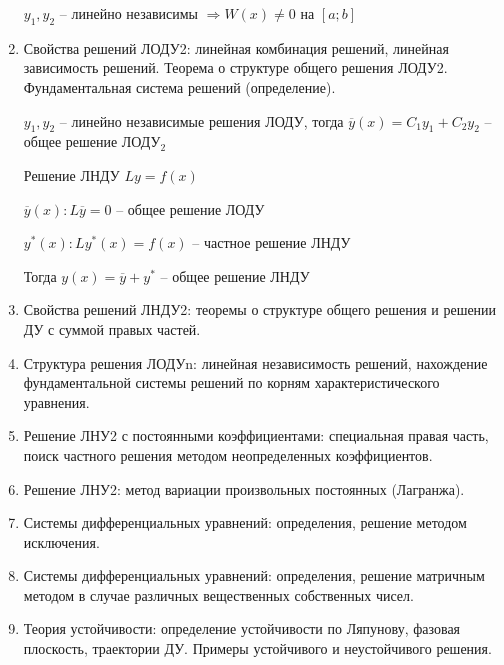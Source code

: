 \documentclass[12pt]{article}
\begin{document}
\begin{enumerate}
        \begin{MyTheorem}
             $y_1, y_2$ -- линейно независимы $\Longrightarrow W(x) \neq 0$ на $[a;b]$
        \end{MyTheorem}
    

        \item Свойства решений ЛОДУ2: линейная комбинация решений, линейная зависимость решений. Теорема о структуре общего решения ЛОДУ2. Фундаментальная система решений (определение).

        \begin{MyTheorem}
             $y_1, y_2$ -- линейно независимые решения ЛОДУ, тогда $\overline{y}(x) = C_1 y_1 + C_2 y_2$ -- общее решение ЛОДУ$_2$
        \end{MyTheorem}

        \begin{MyTheorem}
             Решение ЛНДУ $Ly = f(x)$
    
            $\overline{y}(x): L\overline{y} = 0$ -- общее решение ЛОДУ
    
            $y^*(x): Ly^*(x) = f(x)$ -- частное решение ЛНДУ
    
            Тогда $y(x) = \overline{y} + y^*$ -- общее решение ЛНДУ
        \end{MyTheorem}

        \item Свойства решений ЛНДУ2: теоремы о структуре общего решения и решении ДУ с суммой правых частей.


        \item Структура решения ЛОДУn: линейная независимость решений, нахождение фундаментальной системы решений по корням характеристического уравнения.


        \item Решение ЛНУ2 с постоянными коэффициентами: специальная правая часть, поиск частного решения методом неопределенных коэффициентов.


        \item Решение ЛНУ2: метод вариации произвольных постоянных (Лагранжа).


        \item Системы дифференциальных уравнений: определения, решение методом исключения.


        \item Системы дифференциальных уравнений: определения, решение матричным методом в случае различных вещественных собственных чисел.


        \item Теория устойчивости: определение устойчивости по Ляпунову, фазовая плоскость, траектории ДУ. Примеры устойчивого и неустойчивого решения.


    \end{enumerate}
\end{document}
